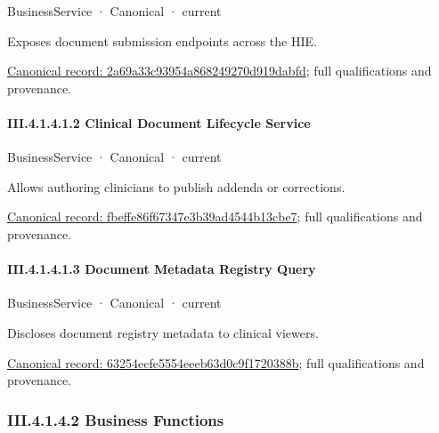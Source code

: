 \label{element:2a69a33c93954a868249270d919dabfd}
{\small BusinessService · Canonical · current}\par

Exposes document submission endpoints across the HIE.


{\footnotesize \href{../../../../../../../continuum/business/business-service/2a69a33c93954a868249270d919dabfd.md}{Canonical record: 2a69a33c93954a868249270d919dabfd}; full qualifications and provenance.}\par
\paragraph*{III.4.1.4.1.2 Clinical Document Lifecycle Service}
\label{navigation:III.4.1.4.1.2}

\label{element:fbeffe86f67347e3b39ad4544b13cbe7}
{\small BusinessService · Canonical · current}\par

Allows authoring clinicians to publish addenda or corrections.


{\footnotesize \href{../../../../../../../continuum/business/business-service/fbeffe86f67347e3b39ad4544b13cbe7.md}{Canonical record: fbeffe86f67347e3b39ad4544b13cbe7}; full qualifications and provenance.}\par
\paragraph*{III.4.1.4.1.3 Document Metadata Registry Query}
\label{navigation:III.4.1.4.1.3}

\label{element:63254ecfe5554eeeb63d0c9f1720388b}
{\small BusinessService · Canonical · current}\par

Discloses document registry metadata to clinical viewers.


{\footnotesize \href{../../../../../../../continuum/business/business-service/63254ecfe5554eeeb63d0c9f1720388b.md}{Canonical record: 63254ecfe5554eeeb63d0c9f1720388b}; full qualifications and provenance.}\par
\subsubsection*{III.4.1.4.2 Business Functions}
\label{navigation:III.4.1.4.2}

